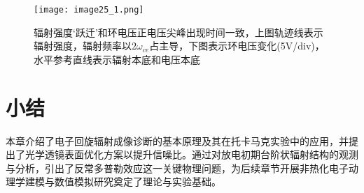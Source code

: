 \begin{figure}[H]
\centering
\texttt{[image: image25\_1.png]}
\caption{\label{fig:DAB}辐射强度‘跃迁’和环电压正电压尖峰出现时间一致，上图轨迹线表示辐射强度，辐射频率以$2ω_{ce}$占主导，下图表示环电压变化(5V/div)，水平参考直线表示辐射本底和电压本底}
\end{figure}






\section{小结}
本章介绍了电子回旋辐射成像诊断的基本原理及其在托卡马克实验中的应用，并提出了光学透镜表面优化方案以提升信噪比。通过对放电初期台阶状辐射结构的观测与分析，引出了反常多普勒效应这一关键物理问题，为后续章节开展非热化电子动理学建模与数值模拟研究奠定了理论与实验基础。











